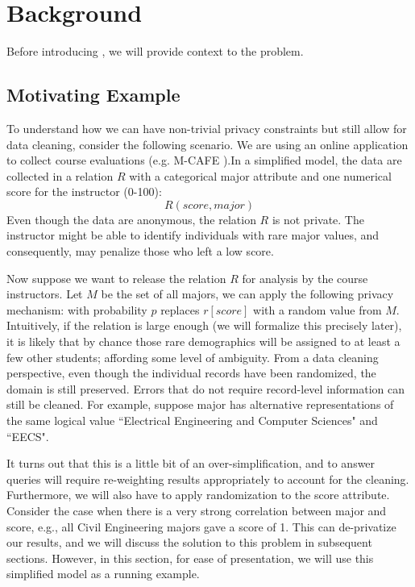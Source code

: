 \section{Background}
Before introducing \sys, we will provide context to the problem.

\subsection{Motivating Example}
To understand how we can have non-trivial privacy constraints but still allow for data cleaning, consider the following scenario.
We are using an online application to collect course evaluations (e.g. M-CAFE \cite{zhou2015m}).In a simplified model, the data are collected in a relation $R$ with a categorical \textsf{major} attribute and one numerical \textsf{score} for the instructor (0-100):
\[
R(score,major)
\] 
Even though the data are anonymous, the relation $R$ is not private.
The instructor might be able to identify individuals with rare \textsf{major} values, and consequently, may penalize those who left a low score.

Now suppose we want to release the relation $R$ for analysis by the course instructors.
Let $M$ be the set of all majors, we can apply the following privacy mechanism: with probability $p$ replaces $r[score]$ with a random value from $M$. 
Intuitively, if the relation is large enough (we will formalize this precisely later), it is likely that by chance those rare demographics will be assigned to at least a few other students; affording some level of ambiguity.
From a data cleaning perspective, even though the individual records have been randomized, the domain is still preserved.
Errors that do not require record-level information can still be cleaned. 
For example, suppose \textsf{major} has alternative representations of the same logical value ``Electrical Engineering and Computer Sciences" and ``EECS".

It turns out that this is a little bit of an over-simplification, and to answer queries will require re-weighting results appropriately to account for the cleaning.
Furthermore, we will also have to apply randomization to the \textsf{score} attribute.
Consider the case when there is a very strong correlation between \textsf{major} and \textsf{score}, e.g., all Civil Engineering majors gave a \textsf{score} of 1. 
This can de-privatize our results, and we will discuss the solution to this problem in subsequent sections.
However, in this section, for ease of presentation, we will use this simplified model as a running example.

